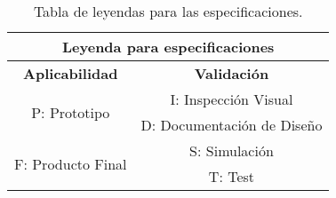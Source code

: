 \begin{table}[H]
\centering
\begin{tabular}{|c|c|}
\hline
\multicolumn{2}{|c|}{\textbf{Leyenda para especificaciones}}    \\ \hline
\textbf{Aplicabilidad}             & \textbf{Validación}        \\ \hline
\multirow{2}{*}{P: Prototipo}      & I: Inspección Visual       \\ \cline{2-2} 
                                   & D: Documentación de Diseño \\ \hline
\multirow{2}{*}{F: Producto Final} & S: Simulación              \\ \cline{2-2} 
                                   & T: Test                    \\ \hline
\end{tabular}
\caption{Tabla de leyendas para las especificaciones.}
\end{table}



